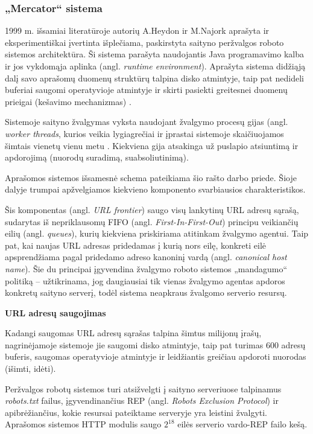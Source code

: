 \subsubsection{„Mercator“ sistema}

1999 m. išsamiai literatūroje autorių A.Heydon ir M.Najork aprašyta ir eksperimentiškai įvertinta išplečiama, paskirstyta saityno peržvalgos roboto sistemos architektūra. Ši sistema parašyta naudojantis Java programavimo kalba ir jos vykdomąja aplinka (angl. \textit{runtime environment}). Aprašyta sistema didžiąją dalį savo aprašomų duomenų struktūrų talpina disko atmintyje, taip pat nedideli buferiai saugomi operatyvioje atmintyje ir skirti pasiekti greitesnei duomenų prieigai (kešavimo mechanizmas) \cite{MercatorLiterature}.


Sistemoje saityno žvalgymas vyksta naudojant žvalgymo procesų gijas (angl. \textit{worker threads}, kurios veikia lygiagrečiai ir įprastai sistemoje skaičiuojamos šimtais vienetų vienu metu \cite{MercatorLiterature}. Kiekviena gija atsakinga už puslapio atsiuntimą ir apdorojimą (nuorodų suradimą, suabsoliutinimą).


Aprašomos sistemos išsamesnė schema pateikiama šio rašto darbo priede. Šioje dalyje trumpai apžvelgiamos kiekvieno komponento svarbiausios charakteristikos.



Šis komponentas (angl. \textit{URL frontier}) saugo visų lankytinų URL adresų sąrašą, sudarytas iš nepriklausomų FIFO (angl. \textit{First-In-First-Out}) principu veikiančių eilių (angl. \textit{queues}), kurių kiekviena priskiriama atitinkam žvalgymo agentui. Taip pat, kai naujas URL adresas pridedamas į kurią nors eilę, konkreti eilė apsprendžiama pagal pridedamo adreso kanoninį vardą (angl. \textit{canonical host name}). Šie du principai įgyvendina žvalgymo roboto sistemos „mandagumo“ politiką -- užtikrinama, jog daugiausiai tik vienas žvalgymo agentas apdoros konkretų saityno serverį, todėl sistema neapkraus žvalgomo serverio resursų.

\vspace{1em}
\textbf{URL adresų saugojimas}
\vspace{1em}

Kadangi saugomas URL adresų sąrašas talpina šimtus milijonų įrašų, nagrinėjamoje sistemoje jie saugomi disko atmintyje, taip pat turimas 600 adresų buferis, saugomas operatyvioje atmintyje ir leidžiantis greičiau apdoroti nuorodas (išimti, idėti).


Peržvalgos robotų sistemos turi atsižvelgti į saityno serveriuose talpinamus \textit{robots.txt} failus, įgyvendinančius REP (angl. \textit{Robots Exclusion Protocol}) ir apibrėžiančius, kokie resursai pateiktame serveryje yra leistini žvalgyti. Aprašomos sistemos HTTP modulis saugo $2^18$ eilės serverio vardo-REP failo kešą.


